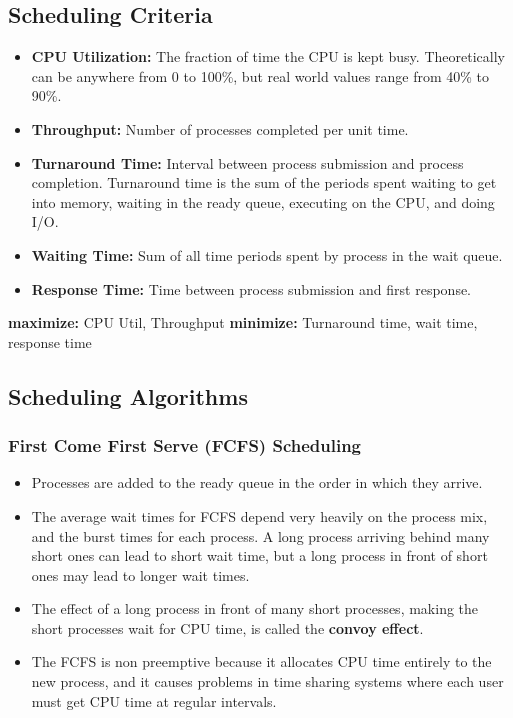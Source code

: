 \documentclass{article}
\begin{document}
\subsection{Scheduling Criteria}
\begin{itemize}
    \item \textbf{CPU Utilization:} The fraction of time the CPU is kept busy. Theoretically can be anywhere from 0 to 100\%, but real world values range from 40\% to 90\%.
    
    \item\textbf{Throughput:} Number of processes completed per unit time. 
    
    \item \textbf{Turnaround Time:} Interval between process submission and process completion. Turnaround time is the sum of the periods spent waiting to get into memory, waiting in the ready queue, executing on the CPU, and doing I/O.
    
    \item \textbf{Waiting Time:} Sum of all time periods spent by process in the wait queue.
    
    \item \textbf{Response Time:} Time between process submission and first response. 
\end{itemize}

\textbf{maximize:} CPU Util, Throughput
\textbf{minimize:} Turnaround time, wait time, response time

\subsection{Scheduling Algorithms}

\subsubsection{First Come First Serve (FCFS) Scheduling}
\begin{itemize}
    \item Processes are added to the ready queue in the order in which they arrive. 
    
    \item The average wait times for FCFS depend very heavily on the process mix, and the burst times for each process. A long process arriving behind many short ones can lead to short wait time, but a long process in front of short ones may lead to longer wait times. 
    
    \item The effect of a long process in front of many short processes, making the short processes wait for CPU time, is called the \textbf{convoy effect}.
    
    \item The FCFS is non preemptive because it allocates CPU time entirely to the new process, and it causes problems in time sharing systems where each user must get CPU time at regular intervals.
\end{itemize}
\end{document}
